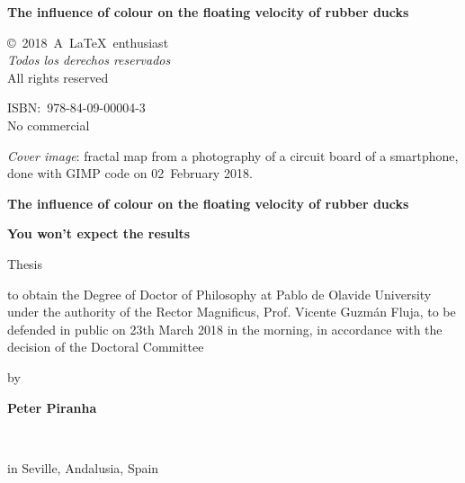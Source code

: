 \def\titulo{ The influence of colour on the floating velocity of rubber ducks }
\thispagestyle{empty}
\null
\vskip50mm
\centerline{\bf\Large \titulo}
\clearpage

\thispagestyle{empty}
\null
\vfill

\noindent
\copyright~2018~A~\LaTeX~enthusiast\\
\emph{Todos los derechos reservados}\\
All rights reserved

\vskip5mm

\noindent
ISBN:~978-84-09-00004-3\\
No commercial 

\vskip5mm

\noindent\parbox{76mm}{\small
\emph{Cover image}: fractal map from a photography of a circuit board of a smartphone, done with GIMP code on 02~February 2018.\par}


\cleardoublepage
{}

\thispagestyle{empty}
\begin{center}

{\Huge\textbf{\titulo}\par}

\bigskipamount

{\Large\textbf{ You won't expect the results }\par}

\bigskipamount


\bigskipamount

{\Large Thesis\par}

\bigskipamount


to obtain the Degree of Doctor of Philosophy at Pablo de Olavide University under the authority of the Rector Magnificus, Prof. Vicente Guzmán Fluja, to be defended in public on 23th March 2018 in the morning, in accordance with the decision of the Doctoral Committee

\bigskipamount

{\large by}

\bigskipamount

{\Large \textbf{Peter Piranha}\par} \\
{\large  {}\par}

\bigskipamount

{\large in Seville, Andalusia, Spain\par}

\end{center}

